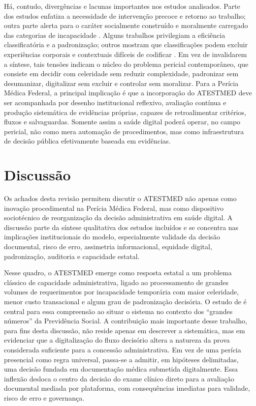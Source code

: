\documentclass[12pt,a4paper]{article}
\begin{document}
Há, contudo, divergências e lacunas importantes nos estudos analisados. Parte dos estudos enfatiza a necessidade de intervenção precoce e retorno ao trabalho; outra parte alerta para o caráter socialmente construído e moralmente carregado das categorias de incapacidade \parencite{gabbay2011niceguidanceonlongtermsicknessandincapacity, dijkstrasdatamakingupincapacityforwork}. Alguns trabalhos privilegiam a eficiência classificatória e a padronização; outros mostram que classificações podem excluir experiências corporais e contextuais difíceis de codificar \parencite{steenbeek2011thedevelopmentofinstrumentstomeasuretheworkdisa, deveau2011workplaceaccommodationandauditbasedevaluationprocess}. Em vez de invalidarem a síntese, tais tensões indicam o núcleo do problema pericial contemporâneo, que consiste em decidir com celeridade sem reduzir complexidade, padronizar sem desumanizar, digitalizar sem excluir e controlar sem moralizar. Para a Perícia Médica Federal, a principal implicação é que a incorporação do ATESTMED deve ser acompanhada por desenho institucional reflexivo, avaliação contínua e produção sistemática de evidências próprias, capazes de retroalimentar critérios, fluxos e salvaguardas. Somente assim a saúde digital poderá operar, no campo pericial, não como mera automação de procedimentos, mas como infraestrutura de decisão pública efetivamente baseada em evidências.

\section{Discussão}
\label{sec:orga8011e0}
Os achados desta revisão permitem discutir o ATESTMED não apenas como inovação procedimental na Perícia Médica Federal, mas como dispositivo sociotécnico de reorganização da decisão administrativa em saúde digital. A discussão parte da síntese qualitativa dos estudos incluídos e se concentra nas implicações institucionais do modelo, especialmente validade da decisão documental, risco de erro, assimetria informacional, equidade digital, padronização, auditoria e capacidade estatal.

Nesse quadro, o ATESTMED emerge como resposta estatal a um problema clássico de capacidade administrativa, ligado ao processamento de grandes volumes de requerimentos por incapacidade temporária com maior celeridade, menor custo transacional e algum grau de padronização decisória. O estudo de \textcite{soares20241031t0000000000asistematicadoatestmednaconcessa} é central para essa compreensão ao situar o sistema no contexto dos “grandes números” da Previdência Social. A contribuição mais importante desse trabalho, para fins desta discussão, não reside apenas em descrever a sistemática, mas em evidenciar que a digitalização do fluxo decisório altera a natureza da prova considerada suficiente para a concessão administrativa. Em vez de uma perícia presencial como regra universal, passa-se a admitir, em hipóteses delimitadas, uma decisão fundada em documentação médica submetida digitalmente. Essa inflexão desloca o centro da decisão do exame clínico direto para a avaliação documental mediada por plataforma, com consequências imediatas para validade, risco de erro e governança.
\end{document}

